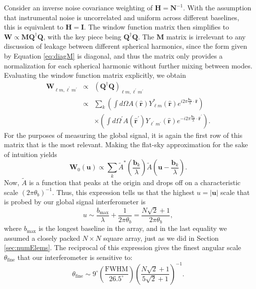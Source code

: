 \documentclass[twolcolumn,apj,iop,numberedappendix]{emulateapj}
\newcommand{\Hmat}{\mathbf{H}}
\newcommand{\Q}{\mathbf{Q}}
\newcommand{\M}{\mathbf{M}}
\newcommand{\W}{\mathbf{W}}
\newcommand{\rhat}{\hat{\mathbf{r}}}
\begin{document}
Consider an inverse noise covariance weighting of $\Hmat = \mathbf{N}^{-1}$. With the assumption that instrumental noise is uncorrelated and uniform across different baselines, this is equivalent to $\Hmat = \mathbf{I}$. The window function matrix then simplifies to $\W \propto \M \Q^\dagger \Q$, with the key piece being $\Q^\dagger \Q$. The $\M$ matrix is irrelevant to any discussion of leakage between different spherical harmonics, since the form given by Equation \eqref{eq:diagM} is diagonal, and thus the matrix only provides a normalization for each spherical harmonic without further mixing between modes. Evaluating the window function matrix explicitly, we obtain
\begin{eqnarray}
\W_{\ell m, \ell^\prime m^\prime} &\propto& \left( \Q^\dagger \Q \right)_{\ell m, \ell^\prime m^\prime} \nonumber \\
& \propto & \sum_k \left( \int d\Omega A(\rhat) Y^*_{\ell m}(\rhat) e^{i 2 \pi \frac{\mathbf{b}_k}{\lambda} \cdot \rhat }\right) \nonumber \\
&& \times \left( \int d\Omega^\prime A(\rhat^\prime) Y_{\ell^\prime m^\prime}(\rhat) e^{-i 2 \pi \frac{\mathbf{b}_k}{\lambda} \cdot \rhat^\prime }\right).
\end{eqnarray}
For the purposes of measuring the global signal, it is again the first row of this matrix that is the most relevant. Making the flat-sky approximation for the sake of intuition yields
\begin{equation}
\label{eq:AnotherApproxWindow}
\W_{0}(\mathbf{u}) \propto \sum_k \widetilde{A}^* \left( \frac{\mathbf{b}_k}{\lambda} \right) \widetilde{A} \left( \mathbf{u} - \frac{\mathbf{b}_k}{\lambda} \right).
\end{equation}
Now, $\widetilde{A}$ is a function that peaks at the origin and drops off on a characteristic scale $(2 \pi \theta_b)^{-1}$. Thus, this expression tells us that the highest $u = | \mathbf{u} |$ scale that is probed by our global signal interferometer is
\begin{equation}
u \sim \frac{b_\textrm{max}}{\lambda} + \frac{1}{2 \pi \theta_b} = \frac{N\sqrt{2} +1}{2 \pi \theta_b},
\end{equation}
where $b_\textrm{max}$ is the longest baseline in the array, and in the last equality we assumed a closely packed $N \times N$ square array, just as we did in Section \ref{sec:numElems}. The reciprocal of this expression gives the finest angular scale $\theta_\textrm{fine}$ that our interferometer is sensitive to:
\begin{equation}
\theta_\textrm{fine} \sim 9^\circ \left( \frac{\textrm{FWHM}}{26.5^\circ} \right) \left( \frac{N \sqrt{2} + 1}{5 \sqrt{2} + 1} \right)^{-1}.
\end{equation}
\end{document}
